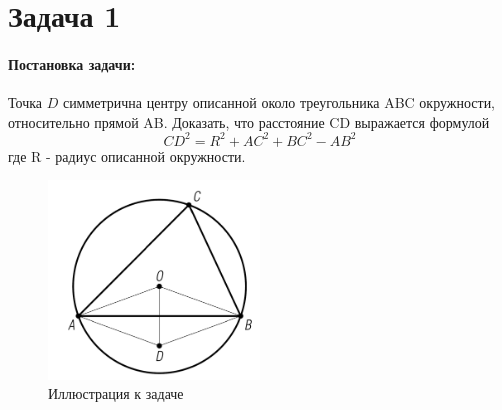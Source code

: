 {
   \section*{Задача 1}
   \paragraph{Постановка задачи:}
   Точка \(D\) симметрична центру описанной около треугольника ABC окружности, относительно прямой AB.
   Доказать, что расстояние CD выражается формулой
   \begin{equation}
      CD^2 = R^2 +AC^2 + BC^2 - AB^2
      \label{t1:f1}
   \end{equation}
   где R - радиус описанной окружности.
   \begin{figure}[h]
      \centering
      \includegraphics[width=0.5\textwidth]{images/task1.png}
      \caption{Иллюстрация к задаче}
      \label{t1:im}
   \end{figure}
}
